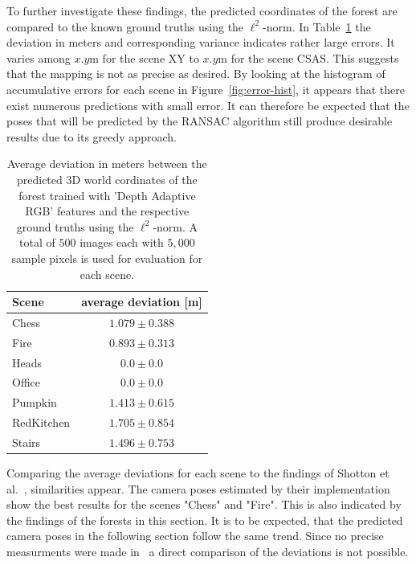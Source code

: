 \documentclass[final]{cvpr}
\begin{document}
To further investigate these findings, the predicted coordinates of the forest are compared to the known ground truths using 
the $\ell^2$-norm. In Table~\ref{tab:forest-error} the deviation in meters and corresponding variance indicates rather large 
errors. It varies among $x.y$m for the scene XY to $x.y$m for the scene CSAS. This suggests that the mapping is not as precise
as desired. By looking at the histogram of accumulative errors for each scene in Figure~\ref{fig:error-hist}, it appears that 
there exist numerous predictions with small error. It can therefore be expected that the poses that will be predicted by the 
RANSAC algorithm still produce desirable results due to its greedy approach.  

\begin{table}
	\begin{center}
	\begin{tabular}{|l|c|}
	\hline
	Scene & average deviation [m]\\
	\hline\hline
	Chess 		& 	$1.079 \pm 0.388$ \\
	Fire 		& 	$0.893 \pm 0.313$	\\
	Heads 		& 	$0.0 \pm 0.0$	\\
	Office 		&   $0.0 \pm 0.0$ \\
	Pumpkin 	& 	$1.413 \pm 0.615$ \\
	RedKitchen 	& 	$1.705 \pm 0.854$ \\
	Stairs 		& 	$1.496 \pm 0.753$ \\
	\hline
	\end{tabular}
	\end{center}
	\label{tab:forest-error}
	\caption{Average deviation in meters between the predicted 3D world cordinates of the forest trained with 
	'Depth Adaptive RGB' features and the respective ground truths using the $\ell^2$-norm. A total of
	$500$ images each with $5,000$ sample pixels is used for evaluation for each scene.}
\end{table}

Comparing the average deviations for each scene to the findings of Shotton et al.~\cite[Table 1]{shotton2013}, similarities appear.
The camera poses estimated by their implementation show the best results for the scenes "Chess" and "Fire". 
This is also indicated by the findings of the forests in this section. It is to be expected, that the predicted camera 
poses in the following section follow the same trend. Since no precise measurments were
made in~\cite{shotton2013} a direct comparison of the deviations is not possible.
\end{document}
